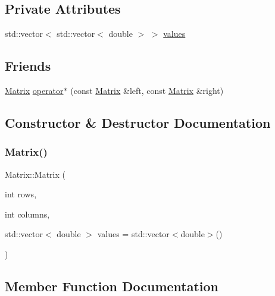 \subsection*{Private Attributes}
\begin{DoxyCompactItemize}
\item 
std\+::vector$<$ std\+::vector$<$ double $>$ $>$ \hyperlink{classMatrix_a5987175ae045377790ff0b1f6cfd2e7b}{values}
\end{DoxyCompactItemize}
\subsection*{Friends}
\begin{DoxyCompactItemize}
\item 
\hyperlink{classMatrix}{Matrix} \hyperlink{classMatrix_a6b58c286243be002bf669704ad15353a}{operator$\ast$} (const \hyperlink{classMatrix}{Matrix} \&left, const \hyperlink{classMatrix}{Matrix} \&right)
\end{DoxyCompactItemize}


\subsection{Constructor \& Destructor Documentation}
\mbox{\label{classMatrix_a5d39846f7d1e7f2f0ca9cb49117221e1}} 
\subsubsection{\texorpdfstring{Matrix()}{Matrix()}}
{\footnotesize\ttfamily Matrix\+::\+Matrix (\begin{DoxyParamCaption}\item[{int}]{rows,  }\item[{int}]{columns,  }\item[{std\+::vector$<$ double $>$}]{values = {\ttfamily std\+:\+:vector$<$double$>$()} }\end{DoxyParamCaption})}



\subsection{Member Function Documentation}
\mbox{\label{classMatrix_a37d08315d9b28e5922e1a75b4d2a4cb9}} 
